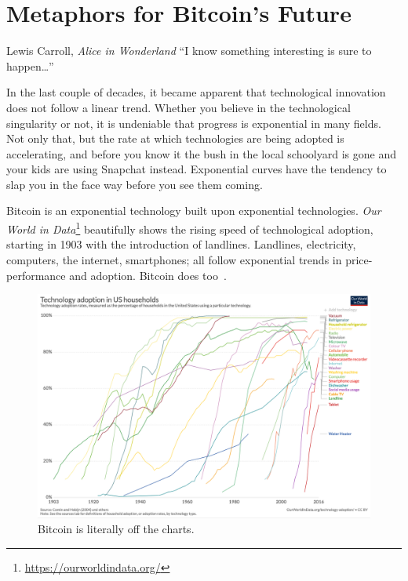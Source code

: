 \chapter{Metaphors for Bitcoin's Future}
\label{les:21}

\begin{chapquote}{Lewis Carroll, \textit{Alice in Wonderland}}
\enquote{I know something interesting is sure to happen\ldots}
\end{chapquote}

In the last couple of decades, it became apparent that technological
innovation does not follow a linear trend. Whether you believe in the
technological singularity or not, it is undeniable that progress is
exponential in many fields. Not only that, but the rate at which
technologies are being adopted is accelerating, and before you know it
the bush in the local schoolyard is gone and your kids are using
Snapchat instead. Exponential curves have the tendency to slap you in
the face way before you see them coming.

Bitcoin is an exponential technology built upon exponential technologies.
\textit{Our World in Data}\footnote{\url{https://ourworldindata.org/}}
beautifully shows the rising speed of technological adoption, starting in 1903
with the introduction of landlines. Landlines, electricity, computers, the
internet, smartphones; all follow exponential trends in price-performance and
adoption. Bitcoin does too~\cite{tech-adoption}.

\begin{figure}
  \includegraphics{assets/images/tech-adoption.png}
  \caption{Bitcoin is literally off the charts.}
  \label{fig:tech-adoption}
\end{figure}


